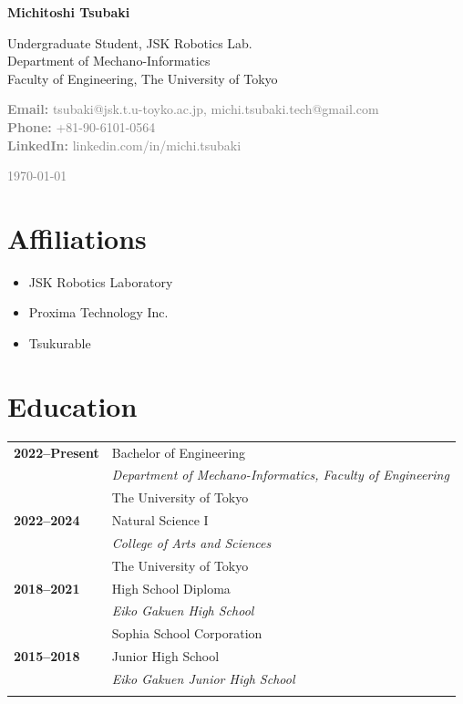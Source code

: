 \documentclass[11pt,a4paper]{article}
\newcommand{\cventry}[4]{\textbf{#1} & #2 \\ & \textit{#3} \\ & #4 \\[0.5em]}
\begin{document}
\begin{minipage}[t]{0.7\textwidth}
    \vspace{0pt}
    {\Huge\bfseries\color{darkblue} Michitoshi Tsubaki}
    \vspace{0.3cm}
    
    {\Large Undergraduate Student, JSK Robotics Lab.}\\
    Department of Mechano-Informatics\\
    Faculty of Engineering, The University of Tokyo
    \vspace{0.5cm}
    
    \textcolor{gray}{
    \textbf{Email:} tsubaki@jsk.t.u-toyko.ac.jp, michi.tsubaki.tech@gmail.com\\
    \textbf{Phone:} +81-90-6101-0564\\
    \textbf{LinkedIn:} linkedin.com/in/michi.tsubaki
    }
\end{minipage}
\hfill
\begin{minipage}[t]{0.25\textwidth}
    \vspace{0pt}
    \raggedleft
    \textcolor{gray}{\small \today}\\[0.3cm]
\end{minipage}

\vspace{1cm}

\section{Affiliations}
\begin{itemize}[leftmargin=1cm,itemsep=0.2em]
    \item JSK Robotics Laboratory
    \item Proxima Technology Inc.
    \item Tsukurable
\end{itemize}

\section{Education}
\begin{tabularx}{\textwidth}{@{}p{2.5cm}X@{}}
\cventry{2022--Present}{Bachelor of Engineering}{Department of Mechano-Informatics, Faculty of Engineering}{The University of Tokyo}
\cventry{2022--2024}{Natural Science I}{College of Arts and Sciences}{The University of Tokyo}
\cventry{2018--2021}{High School Diploma}{Eiko Gakuen High School}{Sophia School Corporation}
\cventry{2015--2018}{Junior High School}{Eiko Gakuen Junior High School}{}
\end{tabularx}
\end{document}
